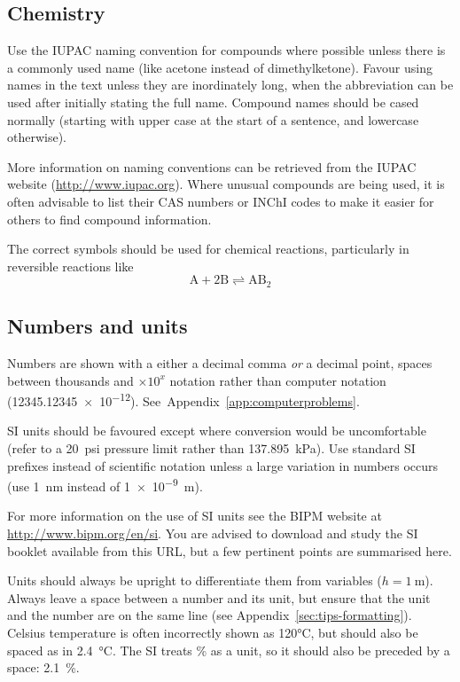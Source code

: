 \documentclass[a5paper, 10pt]{article}
\begin{document}
\subsection{Chemistry}
Use the IUPAC naming convention for compounds where possible unless
there is a commonly used name (like acetone instead of
dimethylketone).  Favour using names in the text unless they are
inordinately long, when the abbreviation can be used after initially
stating the full name.  Compound names should be cased normally
(starting with upper case at the start of a sentence, and lowercase
otherwise).

More information on naming conventions can be retrieved from the IUPAC
website (\url{http://www.iupac.org}).  Where unusual compounds are being used, it is often advisable to list their CAS numbers or INChI codes to make it easier for others to find compound information.

The correct symbols should be used for chemical reactions,
particularly in reversible reactions like
\begin{displaymath}
  \mathrm{A} + 2\mathrm{B} \rightleftharpoons \mathrm{AB}_2
\end{displaymath}

\subsection{Numbers and units}
Numbers are shown with a either a decimal comma \emph{or} a decimal point, spaces between thousands and
$\times 10^x$ notation rather than computer notation
(\num{12345.12345e-12}).  See~Appendix~\ref{app:computerproblems}.

SI units should be favoured except where conversion would be
uncomfortable (refer to a \SI{20}{psi} pressure limit rather than
\SI{137.895}{\kilo\pascal}).
Use standard
SI prefixes instead of scientific notation unless a large variation in
numbers occurs (use \SI{1}{\nano\meter} instead of \SI{1e-9}{\meter}).

For more information on the use of SI units see the BIPM website at \url{http://www.bipm.org/en/si}.  You are advised to download and study the SI booklet available from this URL, but a few pertinent points are summarised here.

Units should always be upright to differentiate them from variables ($h = \SI{1}{\meter}$).  
Always leave a space between a number and its
unit, but ensure that the unit and the number are on the same line
(see Appendix~\ref{sec:tips-formatting}).  Celsius temperature is
often incorrectly shown as 120\si{\celsius}, but should also be spaced
as in \SI{2.4}{\celsius}.  The SI treats \% as a unit, so it should also be preceded by a space: \SI{2.1}{\%}.
\end{document}
